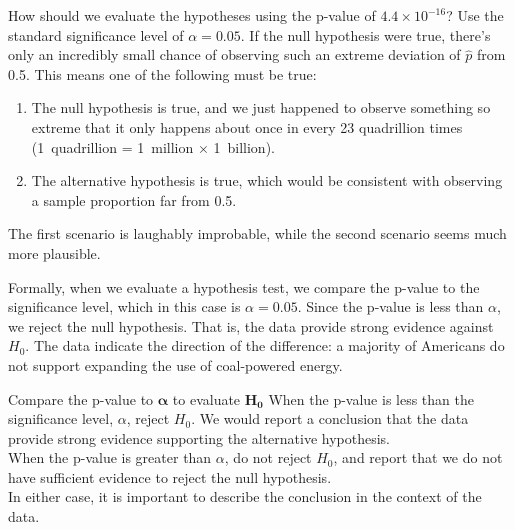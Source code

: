 \begin{examplewrap}
\begin{nexample}{How should we evaluate the hypotheses using the
    p-value of $4.4 \times 10^{-16}$?
    Use the standard significance level of $\alpha = 0.05$.}
  If the null hypothesis were true, there's only an incredibly
  small chance of observing such an extreme deviation of
  $\hat{p}$ from 0.5.
  This means one of the following must be true:
  \begin{enumerate}
    \item The null hypothesis is true, and we just happened
        to observe something so extreme that it only happens
        about once in every 23 quadrillion times
        (1~quadrillion = 1~million $\times$ 1~billion).
    \item The alternative hypothesis is true,
        which would be consistent
        with observing a sample proportion far from 0.5.
  \end{enumerate}
  The first scenario is laughably improbable,
  while the second scenario seems much more plausible.

  Formally, when we evaluate a hypothesis test,
  we compare the p-value to the significance level,
  which in this case is $\alpha = 0.05$.
  Since the p-value is less than $\alpha$,
  we reject the null hypothesis.
  That is, the data provide strong evidence against $H_0$.
  The data indicate the direction of the difference:
  a majority of Americans do not support
  expanding the use of coal-powered energy.
\end{nexample}
\end{examplewrap}


\begin{onebox}{Compare the p-value to $\pmb{\alpha}$ to
      evaluate $\pmb{H_0}$}
  When the p-value is less than the significance level, $\alpha$,
  reject $H_0$. We would report a conclusion that the data provide
  strong evidence supporting the alternative hypothesis. \\[2mm]
  When the p-value is greater than $\alpha$, do not reject $H_0$,
  and report that we do not have sufficient evidence to reject the
  null hypothesis. \\[2mm]
  In either case, it is important to describe the conclusion
  in the context of the data.
\end{onebox}







